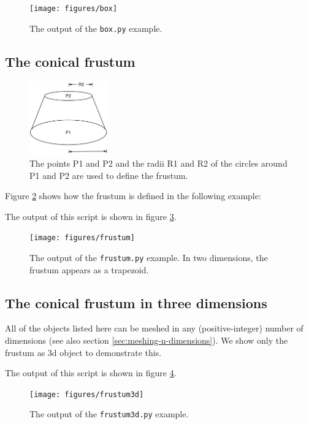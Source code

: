 \documentclass[10pt,a4paper]{book}
\newcommand{\py}[1]{\texttt{\color{blue}#1}}
\begin{document}
\begin{figure}[tbh]
\centerline{\texttt{[image: figures/box]}}
\caption{\label{fig:box}The output of  the \py{box.py} example.}
\end{figure}


\subsection{The conical frustum}
\begin{figure}[tbhp]
\centerline{\includegraphics[width=0.3\textwidth]{plots/frustum3d}}
\caption{\label{fig:frustum3dsketch} The points P1 and P2 and the radii R1 and R2 of the circles around P1 and P2 are used to define the frustum.}
\end{figure}
Figure \ref{fig:frustum3dsketch} shows how the frustum is defined in the following example:

The output of this script is shown in figure \ref{fig:frustum}.
\begin{figure}[tbhp]
\centerline{\texttt{[image: figures/frustum]}}
\caption{\label{fig:frustum}The output of the \py{frustum.py} example. In two dimensions, the frustum appears as a trapezoid.}
\end{figure}




\subsection{The conical frustum in three dimensions}
All of the objects listed here can be meshed in any (positive-integer) number of dimensions (see also section \ref{sec:meshing-n-dimensions}). We show only the frustum as 3d object to demonstrate this.


The output of this script is shown in figure \ref{fig:frustum3d}.
\begin{figure}[tbhp]
\centerline{\texttt{[image: figures/frustum3d]}}
\caption{\label{fig:frustum3d}The output of the \py{frustum3d.py} example.}
\end{figure}
\end{document}
